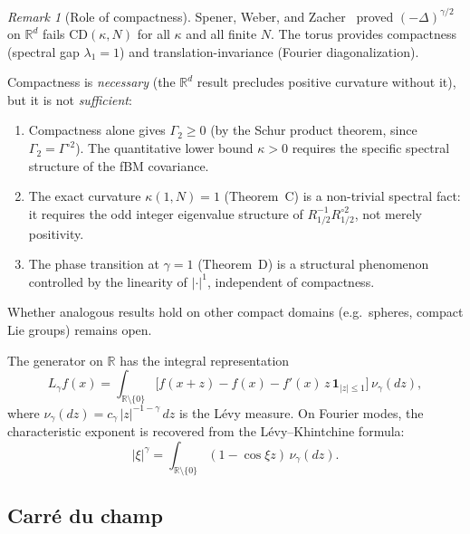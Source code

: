 \documentclass[11pt,a4paper]{article}
\theoremstyle{plain}
\theoremstyle{definition}
\theoremstyle{remark}
\newtheorem{remark}[theorem]{Remark}
\newcommand{\R}{\mathbb{R}}
\begin{document}
\begin{remark}[Role of compactness]\label{rem:compact}
Spener, Weber, and Zacher~\cite{SpenerWeberZacher2020} proved
$(-\Delta)^{\gamma/2}$ on $\R^d$ fails $\mathrm{CD}(\kappa,N)$
for all $\kappa$ and all finite $N$. The torus provides
compactness (spectral gap $\lambda_1 = 1$) and
translation-invariance (Fourier diagonalization).

Compactness is \emph{necessary} (the $\R^d$ result precludes
positive curvature without it), but it is not \emph{sufficient}:
\begin{enumerate}[label=(\roman*)]
\item Compactness alone gives $\Gamma_2 \geq 0$ (by the
  Schur product theorem, since $\Gamma_2 = \Gamma^{\circ 2}$).
  The quantitative lower bound $\kappa > 0$ requires the
  specific spectral structure of the fBM covariance.
\item The exact curvature $\kappa(1,N) = 1$ (Theorem~C) is
  a non-trivial spectral fact: it requires the odd integer
  eigenvalue structure of $R_{1/2}^{-1}R_{1/2}^{\circ 2}$,
  not merely positivity.
\item The phase transition at $\gamma = 1$ (Theorem~D) is a
  structural phenomenon controlled by the linearity of
  $|\cdot|^1$, independent of compactness.
\end{enumerate}
Whether analogous results hold on other compact domains
(e.g.\ spheres, compact Lie groups) remains open.
\end{remark}

The generator on $\R$ has the integral representation
\begin{equation}\label{eq:generator}
  L_\gamma f(x)
  = \int_{\R \setminus \{0\}}
  \bigl[f(x+z) - f(x) - f'(x)\,z\,\mathbf{1}_{|z| \leq 1}\bigr]
  \,\nu_\gamma(dz),
\end{equation}
where $\nu_\gamma(dz) = c_\gamma\,|z|^{-1-\gamma}\,dz$ is the
L\'evy measure.
On Fourier modes, the characteristic exponent is recovered from
the L\'evy--Khintchine formula:
\begin{equation}\label{eq:LK}
  |\xi|^\gamma
  = \int_{\R \setminus \{0\}}
  (1 - \cos \xi z)\,\nu_\gamma(dz).
\end{equation}


\subsection{Carr\'e du champ}
\end{document}

